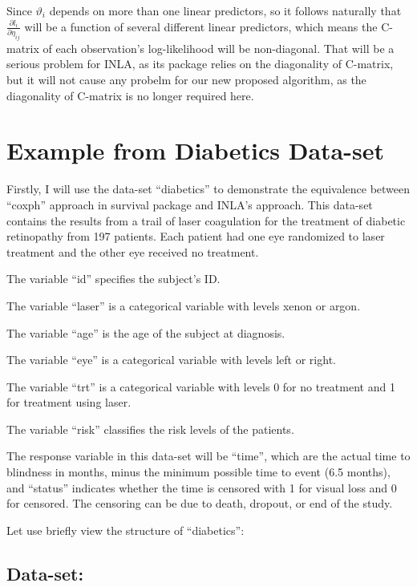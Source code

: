 \documentclass[]{article}
\begin{document}
Since \(\vartheta_i\) depends on more than one linear predictors, so it
follows naturally that \(\frac{\partial l_i}{\partial \eta_{ij}}\) will
be a function of several different linear predictors, which means the
C-matrix of each observation's log-likelihood will be non-diagonal. That
will be a serious problem for INLA, as its package relies on the
diagonality of C-matrix, but it will not cause any probelm for our new
proposed algorithm, as the diagonality of C-matrix is no longer required
here.

\hypertarget{example-from-diabetics-data-set}{%
\section{Example from Diabetics
Data-set}\label{example-from-diabetics-data-set}}

Firstly, I will use the data-set ``diabetics'' to demonstrate the
equivalence between ``coxph'' approach in survival package and INLA's
approach. This data-set contains the results from a trail of laser
coagulation for the treatment of diabetic retinopathy from 197 patients.
Each patient had one eye randomized to laser treatment and the other eye
received no treatment.

The variable ``id'' specifies the subject's ID.

The variable ``laser'' is a categorical variable with levels xenon or
argon.

The variable ``age'' is the age of the subject at diagnosis.

The variable ``eye'' is a categorical variable with levels left or
right.

The variable ``trt'' is a categorical variable with levels 0 for no
treatment and 1 for treatment using laser.

The variable ``risk'' classifies the risk levels of the patients.

The response variable in this data-set will be ``time'', which are the
actual time to blindness in months, minus the minimum possible time to
event (6.5 months), and ``status'' indicates whether the time is
censored with 1 for visual loss and 0 for censored. The censoring can be
due to death, dropout, or end of the study.

Let use briefly view the structure of ``diabetics'':

\hypertarget{data-set}{%
\subsection{Data-set:}\label{data-set}}
\end{document}
